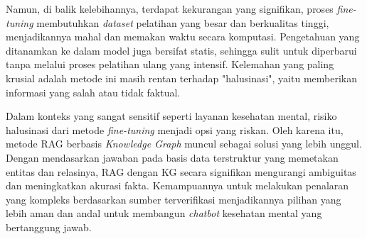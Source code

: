 Namun, di balik kelebihannya, terdapat kekurangan yang signifikan, proses \textit{fine-tuning} membutuhkan \textit{dataset} pelatihan yang besar dan berkualitas tinggi, menjadikannya mahal dan memakan waktu secara komputasi.
Pengetahuan yang ditanamkan ke dalam model juga bersifat statis, sehingga sulit untuk diperbarui tanpa melalui proses pelatihan ulang yang intensif.
Kelemahan yang paling krusial adalah metode ini masih rentan terhadap "halusinasi", yaitu memberikan informasi yang salah atau tidak faktual.

Dalam konteks yang sangat sensitif seperti layanan kesehatan mental, risiko halusinasi dari metode \textit{fine-tuning} menjadi opsi yang riskan.
Oleh karena itu, metode RAG berbasis \textit{\textit{Knowledge Graph}} muncul sebagai solusi yang lebih unggul.
Dengan mendasarkan jawaban pada basis data terstruktur yang memetakan entitas dan relasinya, RAG dengan KG secara signifikan mengurangi ambiguitas dan meningkatkan akurasi fakta.
Kemampuannya untuk melakukan penalaran yang kompleks berdasarkan sumber terverifikasi menjadikannya pilihan yang lebih aman dan andal untuk membangun \textit{chatbot} kesehatan mental yang bertanggung jawab.

